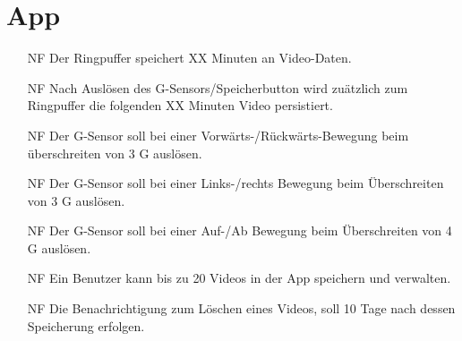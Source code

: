 \section{App}
\begin{itemize}
\item[NF] Der Ringpuffer speichert XX Minuten an Video-Daten.

\item[NF] Nach Auslösen des G-Sensors/Speicherbutton wird zuätzlich zum Ringpuffer die folgenden XX Minuten Video persistiert.

\item[NF] Der G-Sensor soll bei einer Vorwärts-/Rückwärts-Bewegung beim überschreiten von 3 G auslösen.

\item[NF] Der G-Sensor soll bei einer Links-/rechts Bewegung beim Überschreiten von 3 G auslösen.

\item[NF] Der G-Sensor soll bei einer Auf-/Ab Bewegung beim Überschreiten von 4 G auslösen.

\item[NF] Ein Benutzer kann bis zu 20 Videos in der App speichern und verwalten.

\item[NF] Die Benachrichtigung zum Löschen eines Videos, soll 10 Tage nach dessen Speicherung erfolgen.
\end{itemize}

